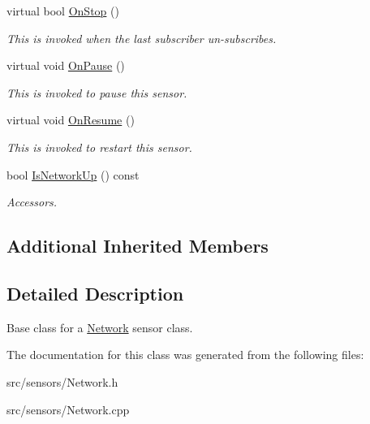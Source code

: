 \begin{DoxyCompactItemize}
virtual bool \hyperlink{class_network_af87fccea8e1cc71e1130e4210f8c751d}{On\+Stop} ()
\begin{DoxyCompactList}\small\item\em This is invoked when the last subscriber un-\/subscribes. \end{DoxyCompactList}\item 
\mbox{\label{class_network_a11df81f4a6df3a321c897f957305ee86}} 
virtual void \hyperlink{class_network_a11df81f4a6df3a321c897f957305ee86}{On\+Pause} ()
\begin{DoxyCompactList}\small\item\em This is invoked to pause this sensor. \end{DoxyCompactList}\item 
\mbox{\label{class_network_a6b2bd8c045b2bedf587f93320d914d2d}} 
virtual void \hyperlink{class_network_a6b2bd8c045b2bedf587f93320d914d2d}{On\+Resume} ()
\begin{DoxyCompactList}\small\item\em This is invoked to restart this sensor. \end{DoxyCompactList}\item 
\mbox{\label{class_network_a0e7c7fc6f5abdd0ea3e00b8425c2cae2}} 
bool \hyperlink{class_network_a0e7c7fc6f5abdd0ea3e00b8425c2cae2}{Is\+Network\+Up} () const
\begin{DoxyCompactList}\small\item\em Accessors. \end{DoxyCompactList}\end{DoxyCompactItemize}
\subsection*{Additional Inherited Members}


\subsection{Detailed Description}
Base class for a \hyperlink{class_network}{Network} sensor class. 

The documentation for this class was generated from the following files\+:\begin{DoxyCompactItemize}
\item 
src/sensors/Network.\+h\item 
src/sensors/Network.\+cpp\end{DoxyCompactItemize}
